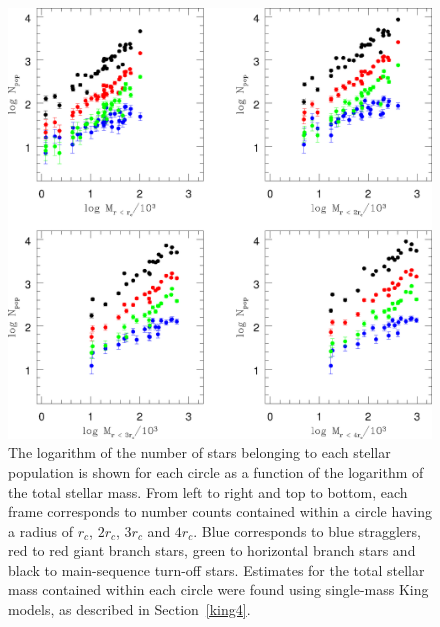 \begin{figure} [!h]
  \begin{center}
 \includegraphics[scale=0.5]{Chapter-4/fig3.eps}
\caption[Plot showing for each circle the logarithm of the number of
stars belonging to each stellar population as a function of the
logarithm of the total stellar mass]{The logarithm of the number of
  stars belonging to each stellar population is shown for each circle
  as a function of the logarithm of the total 
stellar mass.  From left to right and top to bottom, each frame
corresponds to number counts contained within a circle having a
radius of $r_c$, $2r_c$, $3r_c$ and $4r_c$.  Blue corresponds to blue
stragglers, red to red giant branch stars, green to horizontal branch
stars and black to main-sequence turn-off stars.
Estimates for the total
stellar mass contained within each circle were found using single-mass King
models, as described in Section~\ref{king4}.  
\label{fig:Mshell_vs_Npop_2x2_cum}}
\end{center}
\end{figure}


